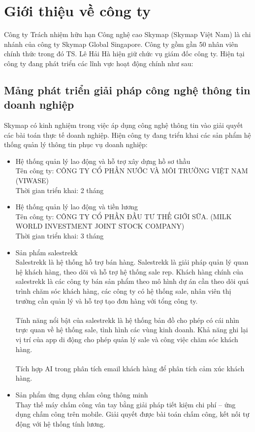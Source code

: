\documentclass[12pt,a4paper]{report}
\begin{document}
\section{Giới thiệu về công ty}
Công ty Trách nhiệm hữu hạn Công nghệ cao Skymap (Skymap Việt Nam) là chi nhánh của
công ty Skymap Global Singapore. Công ty gồm gần 50 nhân viên chính thức trong
đó TS. Lê Hải Hà hiện giữ chức vụ giám đốc công ty. Hiện tại công ty đang phát
triển các lĩnh vực hoạt động chính như sau:
\subsection{Mảng phát triển giải pháp công nghệ thông tin doanh nghiệp}
Skymap có kinh nghiệm trong việc áp dụng công nghệ thông tin vào giải quyết các bài toán thực tế doanh nghiệp. Hiện công ty đang triển khai các sản phẩm hệ thống quản lý thông tin phục vụ doanh nghiệp:
\begin{itemize}
	\item Hệ thống quản lý lao động và hỗ trợ xây dựng hồ sơ thầu\\
	 Tên công ty: CÔNG TY CỔ PHẦN NƯỚC VÀ MÔI TRƯỜNG VIỆT NAM (VIWASE)\\ Thời gian triển khai: 2 tháng
	\item Hệ thống quản lý lao động và tiền lương\\
	Tên công ty: CÔNG TY CỔ PHẦN ĐẦU TƯ THẾ GIỚI SỮA. (MILK WORLD INVESTMENT JOINT STOCK COMPANY) \\Thời gian triển khai: 3 tháng
	\item Sản phẩm salestrekk 
	\\Salestrekk là hệ thống hỗ trợ bán hàng. Salestrekk là giải pháp quản lý quan hệ khách hàng, theo dõi và hỗ trợ hệ thống sale rep.
	Khách hàng chính của salestrekk là các công ty bán sản phẩm theo mô hình dự án cần theo dõi quá trình chăm sóc khách hàng, các công ty có hệ thống sale, nhân viên thị trường cần quản lý và hỗ trợ tạo đơn hàng với tổng công ty. \\\\
	Tính năng nổi bật của salestrekk là hệ thống bản đồ cho phép có cái nhìn trực quan về hệ thống sale, tình hình các vùng kinh doanh. Khả năng ghi lại vị trí của app di động cho phép quản lý sale và công việc chăm sóc khách hàng.\\\\
	Tích hợp AI trong phân tích email khách hàng để phân tích cảm xúc khách hàng.
	
	
	\item Sản phẩm ứng dụng chấm công thông minh\\Thay thế máy chấm công vân tay bằng giải pháp tiết kiệm chi phí – ứng dụng chấm công trên mobile. Giải quyết được bài toán chấm công, kết nối tự động với hệ thống tính lương.
\end{itemize}
\end{document}
